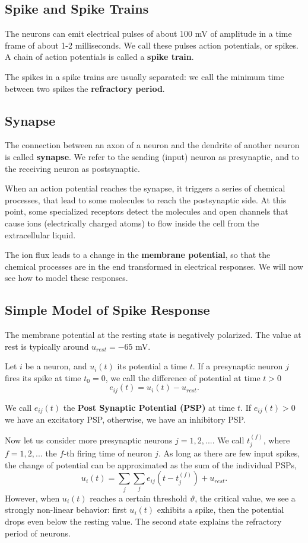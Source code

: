 \documentclass[oneside]{book}
\theoremstyle{definition}
\theoremstyle{plain}
\begin{document}
\subsection{Spike and Spike Trains}
The neurons can emit electrical pulses of about 100 mV of amplitude in a time frame of about 1-2 milliseconds. We call these pulses action potentials, or spikes.
A chain of action potentials is called a \textbf{spike train}.


The spikes in a spike trains are usually separated: we call the minimum time between two spikes the \textbf{refractory period}.

\subsection{Synapse}
The connection between an axon of a neuron and the dendrite of another neuron is called \textbf{synapse}. We refer to the sending (input) neuron as presynaptic, and to the receiving neuron as postsynaptic.

When an action potential reaches the synapse, it triggers a series of chemical processes, that lead to some molecules to reach the postsynaptic side. At this point, some specialized receptors detect the molecules and open channels that cause ions (electrically charged atoms) to flow inside the cell from the extracellular liquid.

The ion flux leads to a change in the \textbf{membrane potential}, so that the chemical processes are in the end transformed in electrical responses. We will now see how to model these responses.

\subsection{Simple Model of Spike Response}
The membrane potential at the resting state is negatively polarized. The value at rest is typically around $u_{rest}=-65$ mV. 

Let $i$ be a neuron, and $u_i(t)$ its potential a time $t$. If a presynaptic neuron $j$ fires its spike at time $ t_0=0 $, we call the difference of potential at time $ t>0 $
$$e_{ij}(t)=u_i(t)-u_{rest}.$$

We call $e_{ij}(t)$ the \textbf{Post Synaptic Potential (PSP)} at time $t$. If $e_{ij}(t)>0$ we have an excitatory PSP, otherwise, we have an inhibitory PSP.

Now let us consider more presynaptic neurons $j=1,2,...$. We call $t_j^{(f)}$, where $f=1,2,...$ the $f$-th firing time of neuron $j$.  As long as there are few input spikes, the change of potential can be approximated as the sum of the individual PSPs,
\begin{equation}
    u_i(t)=\sum_{j}\sum_{f} e_{ij}(t-t_j^{(f)}) + u_{rest}.
\end{equation}
However, when $u_i(t)$ reaches a certain threshold $\vartheta$, the critical value, we see a strongly non-linear behavior: first $u_i(t)$ exhibits a spike, then the potential drops even below the resting value. The second state explains the refractory period of neurons.
\end{document}
